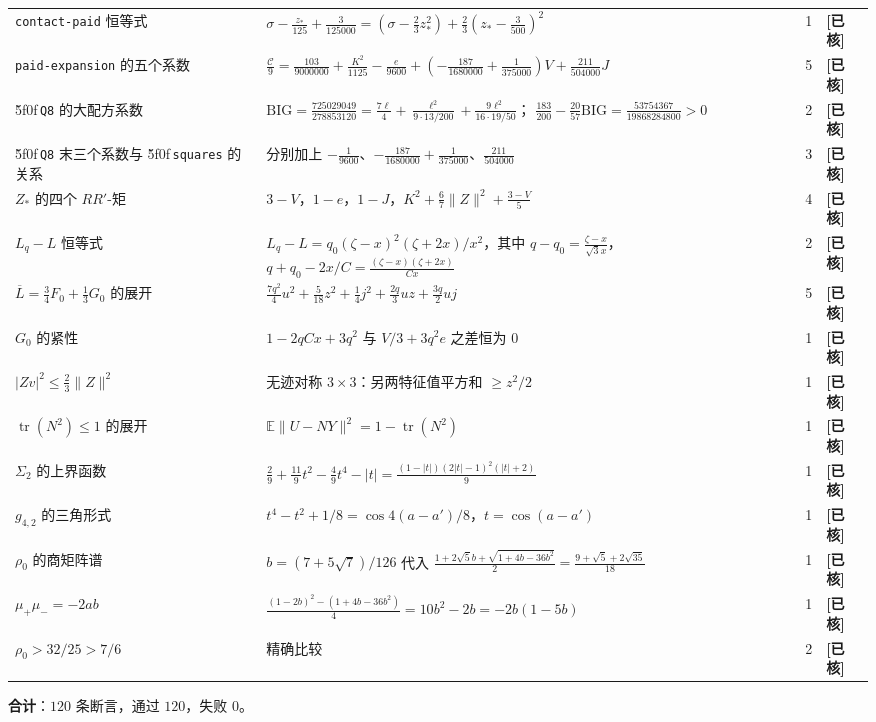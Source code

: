 \documentclass[UTF8,11pt]{ctexart}
\theoremstyle{definition}
\newcommand{\E}{\mathbb{E}}
\newcommand{\peq}[1]{\textup{\u5f0f}\,\texttt{#1}}
\newcommand{\chk}{\textcolor[rgb]{0.05,0.25,0.55}{\bfseries [已核]}}
\begin{document}
\begin{longtable}{@{}p{}p{}cp{}@{}}
\texttt{contact-paid} 恒等式 &
 $\sigma-\frac{z_*}{125}+\frac3{125000}=(\sigma-\frac23z_*^2)+\frac23(z_*-\frac3{500})^2$ & 1 & \chk\\
\texttt{paid-expansion} 的五个系数 &
 $\frac{\mathcal C}9=\frac{103}{9000000}+\frac{K^2}{1125}-\frac e{9600}
  +(-\frac{187}{1680000}+\frac1{375000})V+\frac{211}{504000}J$ & 5 & \chk\\
\peq{Q8} 的大配方系数 &
 $\mathrm{BIG}=\frac{725029049}{278853120}=\frac{7\ell}4+\frac{\ell^2}{9\cdot13/200}
  +\frac{9\ell^2}{16\cdot19/50}$；
 $\frac{183}{200}-\frac{20}{57}\mathrm{BIG}=\frac{53754367}{19868284800}>0$ & 2 & \chk\\
\peq{Q8} 末三个系数与 \peq{squares} 的关系 &
 分别加上 $-\frac1{9600}$、$-\frac{187}{1680000}+\frac1{375000}$、$\frac{211}{504000}$ & 3 & \chk\\
$Z_*$ 的四个 $RR'$-矩 & $3-V$，$1-e$，$1-J$，$K^2+\frac67\|Z\|^2+\frac{3-V}5$ & 4 & \chk\\
$L_q-L$ 恒等式 & $L_q-L=q_0(\zeta-x)^2(\zeta+2x)/x^2$，其中 $q-q_0=\frac{\zeta-x}{\sqrt3x}$，
 $q+q_0-2x/C=\frac{(\zeta-x)(\zeta+2x)}{Cx}$ & 2 & \chk\\
$\overline L=\frac34F_0+\frac13G_0$ 的展开 &
 $\frac{7q^2}4u^2+\frac5{18}z^2+\frac14j^2+\frac{2q}3uz+\frac{3q}2uj$ & 5 & \chk\\
$G_0$ 的紧性 & $1-2qCx+3q^2$ 与 $V/3+3q^2e$ 之差恒为 $0$ & 1 & \chk\\
$|Zv|^2\le\frac23\|Z\|^2$ & 无迹对称 $3\times3$：另两特征值平方和 $\ge z^2/2$ & 1 & \chk\\
$\operatorname{tr}(N^2)\le1$ 的展开 & $\E\|U-NY\|^2=1-\operatorname{tr}(N^2)$ & 1 & \chk\\
$\Sigma_2$ 的上界函数 & $\frac29+\frac{11}9t^2-\frac49t^4-|t|=\frac{(1-|t|)(2|t|-1)^2(|t|+2)}9$ & 1 & \chk\\
$g_{4,2}$ 的三角形式 & $t^4-t^2+1/8=\cos4(a-a')/8$，$t=\cos(a-a')$ & 1 & \chk\\
$\rho_0$ 的商矩阵谱 & $b=(7+5\sqrt7)/126$ 代入
 $\frac{1+2\sqrt5b+\sqrt{1+4b-36b^2}}2=\frac{9+\sqrt5+2\sqrt{35}}{18}$ & 1 & \chk\\
$\mu_+\mu_-=-2ab$ & $\frac{(1-2b)^2-(1+4b-36b^2)}4=10b^2-2b=-2b(1-5b)$ & 1 & \chk\\
$\rho_0>32/25>7/6$ & 精确比较 & 2 & \chk\\
\bottomrule
\end{longtable}
\endgroup

\noindent\textbf{合计}：$120$ 条断言，通过 $120$，失败 $0$。
\end{document}
